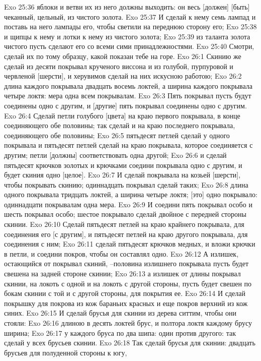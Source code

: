 Exo 25:36  яблоки и ветви их из него должны выходить: он весь [должен] [быть] чеканный, цельный, из чистого золота.
Exo 25:37  И сделай к нему семь лампад и поставь на него лампады его, чтобы светили на переднюю сторону его;
Exo 25:38  и щипцы к нему и лотки к нему из чистого золота;
Exo 25:39  из таланта золота чистого пусть сделают его со всеми сими принадлежностями.
Exo 25:40  Смотри, сделай их по тому образцу, какой показан тебе на горе.
Exo 26:1  Скинию же сделай из десяти покрывал крученого виссона и из голубой, пурпуровой и червленой [шерсти], и херувимов сделай на них искусною работою;
Exo 26:2  длина каждого покрывала двадцать восемь локтей, а ширина каждого покрывала четыре локтя: мера одна всем покрывалам.
Exo 26:3  Пять покрывал пусть будут соединены одно с другим, и [другие] пять покрывал соединены одно с другим.
Exo 26:4  Сделай петли голубого [цвета] на краю первого покрывала, в конце соединяющего обе половины; так сделай и на краю последнего покрывала, соединяющего обе половины;
Exo 26:5  пятьдесят петлей сделай у одного покрывала и пятьдесят петлей сделай на краю покрывала, которое соединяется с другим; петли [должны] соответствовать одна другой;
Exo 26:6  и сделай пятьдесят крючков золотых и крючками соедини покрывала одно с другим, и будет скиния одно [целое].
Exo 26:7  И сделай покрывала на козьей [шерсти], чтобы покрывать скинию; одиннадцать покрывал сделай таких;
Exo 26:8  длина одного покрывала тридцать локтей, а ширина четыре локтя; [это] одно покрывало: одиннадцати покрывалам одна мера.
Exo 26:9  И соедини пять покрывал особо и шесть покрывал особо; шестое покрывало сделай двойное с передней стороны скинии.
Exo 26:10  Сделай пятьдесят петлей на краю крайнего покрывала, для соединения его [с другим], и пятьдесят петлей на краю другого покрывала, для соединения с ним;
Exo 26:11  сделай пятьдесят крючков медных, и вложи крючки в петли, и соедини покров, чтобы он составлял одно.
Exo 26:12  А излишек, остающийся от покрывал скиний, --половина излишнего покрывала пусть будет свешена на задней стороне скинии;
Exo 26:13  а излишек от длины покрывал скинии, на локоть с одной и на локоть с другой стороны, пусть будет свешен по бокам скинии с той и с другой стороны, для покрытия ее.
Exo 26:14  И сделай покрышку для покрова из кож бараньих красных и еще покров верхний из кож синих.
Exo 26:15  И сделай брусья для скинии из дерева ситтим, чтобы они стояли:
Exo 26:16  длиною в десять локтей брус, и полтора локтя каждому брусу ширина;
Exo 26:17  у каждого бруса по два шипа: один против другого: так сделай у всех брусьев скинии.
Exo 26:18  Так сделай брусья для скинии: двадцать брусьев для полуденной стороны к югу,
